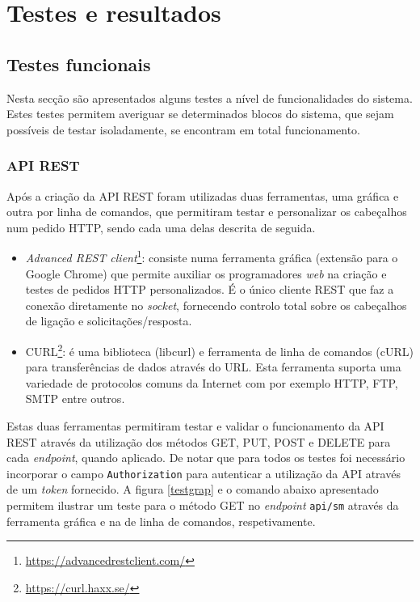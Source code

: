 \chapter{Testes e resultados}



\section{Testes funcionais}


Nesta secção são apresentados alguns testes a nível de funcionalidades do sistema. Estes testes permitem averiguar se determinados blocos do sistema, que sejam possíveis de testar isoladamente, se encontram em total funcionamento. 

\subsection{API REST}


Após a criação da API REST foram utilizadas duas ferramentas, uma gráfica e outra por linha de comandos, que permitiram testar e personalizar os cabeçalhos num pedido HTTP, sendo cada uma delas descrita de seguida.


\begin{itemize}
	\item \textit{Advanced REST client}\footnote{\url{https://advancedrestclient.com/}}: consiste numa ferramenta gráfica (extensão para o Google Chrome) que permite auxiliar os programadores \textit{web} na criação e testes de pedidos \ac{HTTP} personalizados. É o único cliente \ac{REST} que faz a conexão diretamente no \textit{socket}, fornecendo controlo total sobre os cabeçalhos de ligação e solicitações/resposta.
	 
	\item CURL\footnote{\url{https://curl.haxx.se/}}: é uma biblioteca (libcurl) e ferramenta de linha de comandos (cURL) para transferências de dados através do \ac{URL}. Esta ferramenta suporta uma variedade de protocolos comuns da Internet com por exemplo \ac{HTTP}, \ac{FTP}, \ac{SMTP} entre outros. 
\end{itemize}


Estas duas ferramentas permitiram testar e validar o funcionamento da API REST através da utilização dos métodos GET, PUT, POST e DELETE para cada \textit{endpoint}, quando aplicado. De notar que para todos os testes foi necessário incorporar o campo \texttt{Authorization} para autenticar a utilização da API através de um \textit{token} fornecido. A figura \ref{testgrap} e o comando abaixo apresentado permitem ilustrar um teste para o método GET no \textit{endpoint} \texttt{api/sm} através da ferramenta gráfica e na de linha de comandos, respetivamente. 






